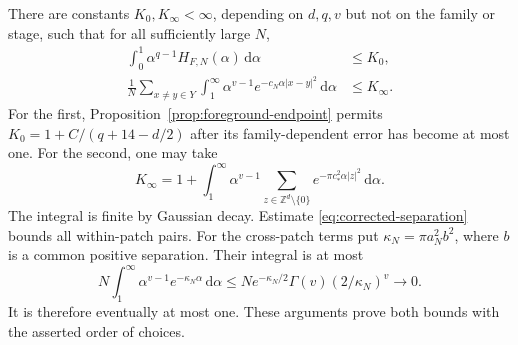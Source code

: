 \documentclass[11pt,a4paper]{article}
\theoremstyle{definition}
\newcommand{\Z}{\mathbb Z}
\newcommand{\dd}{\,\mathrm d}
\newcommand{\abs}[1]{\lvert#1\rvert}
\numberwithin{equation}{section}
\begin{document}
There are constants $K_0,K_\infty<\infty$, depending on $d,q,v$ but not on the family or stage, such that for all sufficiently large $N$,
\begin{align}
 \int_0^1\alpha^{q-1}H_{F,N}(\alpha)\dd\alpha&\le K_0,
                                                       \label{eq:foreground-macro}\\
 \frac1N\sum_{x\ne y\in Y}\int_1^\infty
       \alpha^{v-1}e^{-c_N\alpha\abs{x-y}^2}\dd\alpha&\le K_\infty.
                                                       \label{eq:foreground-tail}
\end{align}
For the first, Proposition~\ref{prop:foreground-endpoint} permits
$K_0=1+C/(q+14-d/2)$ after its family-dependent error has become at most one. For the second, one may take
\begin{equation}\label{eq:foreground-tail-constant}
 K_\infty=1+\int_1^\infty\alpha^{v-1}
       \sum_{z\in\Z^d\setminus\{0\}}e^{-\pi c_*^2\alpha\abs z^2}\dd\alpha.
\end{equation}
The integral is finite by Gaussian decay. Estimate \eqref{eq:corrected-separation} bounds all within-patch pairs. For the cross-patch terms put $\kappa_N=\pi a_N^2b^2$, where $b$ is a common positive separation. Their integral is at most
\[
 N\int_1^\infty\alpha^{v-1}e^{-\kappa_N\alpha}\dd\alpha
 \le N e^{-\kappa_N/2}\Gamma(v)(2/\kappa_N)^v\longrightarrow0.
\]
It is therefore eventually at most one. These arguments prove both bounds with the asserted order of choices.
\end{document}
